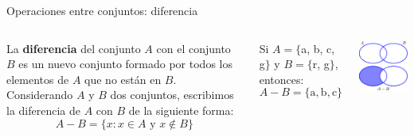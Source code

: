 \documentclass[9pt, aspectratio=169]{beamer}
\begin{document}
\begin{frame}{Operaciones entre conjuntos: diferencia}
\begin{columns}[c]
\cx
\begin{definition}
    La \textbf{diferencia} del conjunto $A$ con el conjunto $B$ es un nuevo conjunto formado por todos los elementos de $A$ que no están en $B$. Considerando $A$ y $B$ dos conjuntos, escribimos la diferencia de $A$ con $B$ de la siguiente forma:
    \[ A - B = \{ x : x \in A \text{ y } x \notin B \} \]
\end{definition}

\begin{example}
    Si $A = \{$a, b, c, g$\}$ y $B = \{$r, g$\}$, entonces:
    \[ A - B = \{\text{a}, \text{b}, \text{c} \} \]
\end{example}

\cx
\begin{center}
    \includegraphics[scale=1.0]{figs/fig-05.pdf}
\end{center}
\end{columns}
\end{frame}
\end{document}
